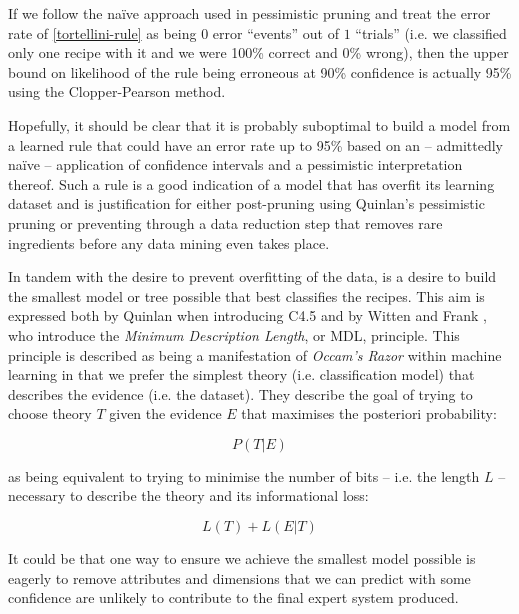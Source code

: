 \documentclass[11pt,a4paper]{article}
\begin{document}
If we follow the na\"ive approach used in pessimistic pruning and treat the error rate
of \eqref{tortellini-rule} as being $0$ error ``events'' out of $1$ ``trials'' (i.e.
we classified only one recipe with it and we were 100\% correct and 0\% wrong), then
the upper bound on likelihood of the rule being erroneous at 90\% confidence is
actually 95\% using the Clopper-Pearson method. \cite{clopper1934use}

Hopefully, it should be clear that it is probably suboptimal to build a model from
a learned rule that could
have an error rate up to 95\% based on an -- admittedly na\"ive -- application of
confidence intervals and a pessimistic interpretation thereof.
Such a rule is a good indication of a model that has overfit
its learning dataset and is justification for either post-pruning using Quinlan's
pessimistic pruning or preventing through a data reduction step that removes rare
ingredients before any data mining even takes place.

In tandem with the desire to prevent overfitting of the data, is a desire to build
the smallest model or tree possible that best classifies the recipes. This
aim is expressed both by Quinlan when introducing C4.5 \cite{quinlan1993c4}
and by Witten and Frank \cite{witten2011data}, who introduce the
\emph{Minimum Description Length}, or MDL, principle. This principle is
described as being a manifestation of \emph{Occam's Razor} within machine learning
in that we prefer the simplest theory (i.e. classification model) that describes
the evidence (i.e. the dataset). They describe the goal of trying to choose
theory $T$ given the evidence $E$ that maximises the posteriori probability:

\begin{equation}
P(T | E)
\end{equation}

\noindent as being equivalent to trying to minimise the number of bits -- i.e. the length $L$
 -- necessary to describe the theory and its informational loss:

\begin{equation}
L(T) + L(E | T)
\end{equation}

It could be that one way to ensure we achieve the smallest model possible is eagerly to remove
attributes and dimensions that we can predict with some confidence are unlikely
to contribute to the final expert system produced.
\end{document}
